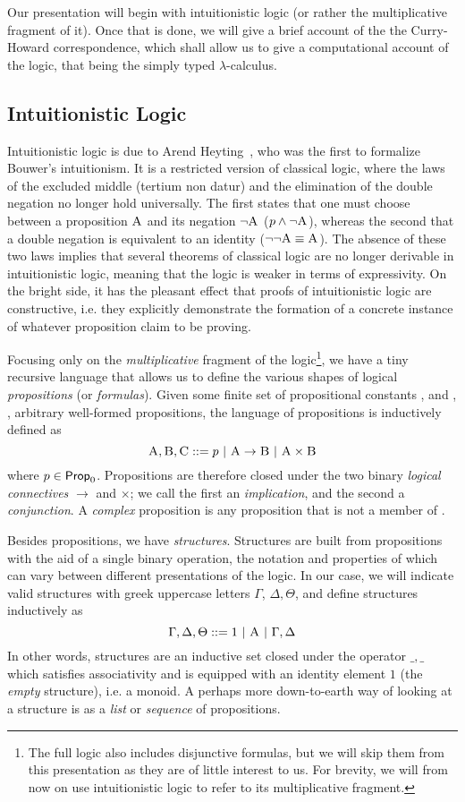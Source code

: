 Our presentation will begin with intuitionistic logic (or rather the multiplicative fragment of it). 
Once that is done, we will give a brief account of the the Curry-Howard correspondence, which shall allow us to give a computational account of the logic, that being the simply typed $\lambda$-calculus.

\subsection{Intuitionistic Logic}
Intuitionistic logic is due to Arend Heyting~\cite{heyting1930}, who was the first to formalize Bouwer's intuitionism.
It is a restricted version of classical logic, where the laws of the excluded middle (tertium non datur) and the elimination of the double negation no longer hold universally.
The first states that one must choose between a proposition $\prop{A}$ and its negation $\neg \prop{A}$ ($p \wedge \neg \prop{A}$), whereas the second that a double negation is equivalent to an identity ($\neg \neg \prop{A} \equiv \prop{A}$).
The absence of these two laws implies that several theorems of classical logic are no longer derivable in intuitionistic logic, meaning that the logic is weaker in terms of expressivity.
On the bright side, it has the pleasant effect that proofs of intuitionistic logic are constructive, i.e. they explicitly demonstrate the formation of a concrete instance of whatever proposition claim to be proving.

Focusing only on the \textit{multiplicative} fragment of the logic\footnote{The full logic also includes disjunctive formulas, but we will skip them from this presentation as they are of little interest to us. For brevity, we will from now on use intuitionistic logic to refer to its multiplicative fragment.}, we have a tiny recursive language that allows us to define the various shapes of logical \textit{propositions} (or \textit{formulas}).
Given some finite set of propositional constants \propcon{}, and , ,  arbitrary well-formed propositions, the language of propositions is inductively defined as 
\[
\prop{A}, \prop{B}, \prop{C} ::= p \ | \ \prop{A} \to \prop{B} \ | \ \prop{A} \times \prop{B}
\]
where $p \in \mathsf{Prop}_0{}$.
Propositions are therefore closed under the two binary \textit{logical connectives} $\to$ and $\times$; we call the first an \textit{implication}, and the second a \textit{conjunction}. 
A \textit{complex} proposition is any proposition that is not a member of \propcon.

Besides propositions, we have \textit{structures}. 
Structures are built from propositions with the aid of a single binary operation, the notation and properties of which can vary between different presentations of the logic.
In our case, we will indicate valid structures with greek uppercase letters $\Gamma$, $\Delta, \Theta$, and define structures inductively as 
\[
	\Gamma, \Delta, \Theta ::= 1 \ | \ \prop{A} \ | \ \Gamma, \Delta
\]
In other words, structures are an inductive set closed under the operator $\_,\_$ which satisfies associativity and is equipped with an identity element $1$ (the \textit{empty} structure), i.e. a monoid.
A perhaps more down-to-earth way of looking at a structure is as a \textit{list} or \textit{sequence} of propositions.

